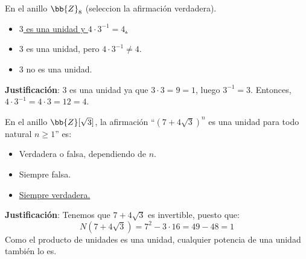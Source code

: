 \documentclass[12pt]{article}
\newcounter{ejercicio}[section] %
\newcounter{ejercicio}
\begin{document}
    \begin{ejercicio}
        En el anillo $\bb{Z}_8$ (seleccion la afirmación verdadera).
        \begin{itemize}
            \item \underline{$3$ es una unidad y $4 \cdot 3^{-1} = 4$.}
            \item $3$ es una unidad, pero $4 \cdot 3^{-1} \neq 4$.
            \item $3$ no es una unidad.
        \end{itemize}

        \noindent
        \textbf{Justificación}:
        $3$ es una unidad ya que $3 \cdot 3 = 9 = 1$, luego $3^{-1} = 3$.\newline
        Entonces, $4 \cdot 3^{-1} = 4 \cdot 3 = 12 = 4$.
    \end{ejercicio}

    \begin{ejercicio}
        En el anillo $\bb{Z}[\sqrt{3}]$, la afirmación ``$(7+4\sqrt{3})^n$ es una unidad para todo natural $n \geq 1$'' es:
        \begin{itemize}
            \item Verdadera o falsa, dependiendo de $n$.
            \item Siempre falsa.
            \item \underline{Siempre verdadera.}
        \end{itemize}

        \noindent
        \textbf{Justificación}:
        Tenemos que $7 + 4\sqrt{3}$ es invertible, puesto que:
        $$N(7+4\sqrt{3}) = 7^2 - 3 \cdot 16 = 49 - 48 = 1$$
        Como el producto de unidades es una unidad, cualquier potencia de una unidad también lo es.
    \end{ejercicio}
\end{document}
